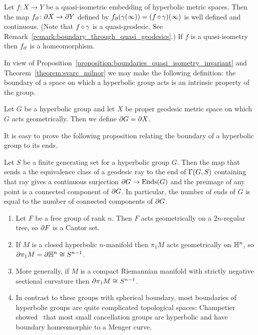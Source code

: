 \begin{proposition}\label{proposition:boundaries_quasi_isometry_invariant}
  Let $f \colon X \to Y$ be a quasi-isometric embedding of hyperbolic metric spaces.
  Then the map $f_\partial \colon \partial X \to \partial Y$ defined by $f_\partial(\gamma(\infty)) = (f \operatorname{\circ} \gamma)(\infty)$ is well defined and continuous.
  (Note that $f \operatorname{\circ} \gamma$ is a quasi-geodesic. See Remark~\ref{remark:boundary_through_quasi_geodesics}.)
  If $f$ is a quasi-isometry then $f_\partial$ is a homeomorphism.
\end{proposition}

In view of Proposition~\ref{proposition:boundaries_quasi_isometry_invariant} and Theorem~\ref{theorem:svarc_milnor} we may make the following definition: the boundary of a space on which a hyperbolic group acts is an intrinsic property of the group.

\begin{definition}
  Let $G$ be a hyperbolic group and let $X$ be proper geodesic metric space on which $G$ acts geometrically.
  Then we define $\partial G = \partial X$.
\end{definition}

It is easy to prove the following proposition relating the boundary of a hyperbolic group to its ends.

\begin{proposition}
  Let $S$ be a finite generating set for a hyperbolic group $G$.
  Then the map that sends a the equivalence class of a geodesic ray to the end of $\operatorname{\Gamma}(G,S)$ containing that ray gives a continuous surjection $\partial G \to \operatorname{Ends}(G)$ and the preimage of any point is a connected component of $\partial G$. 
  In particular, the number of ends of $G$ is equal to the number of connected components of $\partial G$.
\end{proposition}

\begin{example}
  \label{example:boundaries}
  \begin{enumerate}
    \item Let $F$ be a free group of rank $n$. 
      Then $F$ acts geometrically on a $2n$-regular tree, so $\partial F$ is a Cantor set.
    \item If $M$ is a closed hyperbolic $n$-manifold then $\pi_1M$ acts geometrically on $\mathbb{H}^n$, so $\partial\pi_1M = \partial \mathbb{H}^n \cong S^{n-1}$.
    \item More generally, if $M$ is a compact Riemannian manifold with strictly negative sectional curvature then $\partial\pi_1M \cong S^{n-1}$.
    \item In contrast to these groups with spherical boundary, most boundaries of hyperbolic groups are quite complicated topological spaces: Champetier showed~\cite{champetier95} that most small cancellation groups are hyperbolic and have boundary homeomorphic to a Menger curve.
  \end{enumerate}
\end{example}

